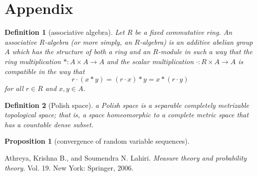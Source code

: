 \documentclass{report}
\newtheorem{definition}{Definition}[section]
\newtheorem{proposition}{Proposition}[section]
\theoremstyle{nonumberplain}
\begin{document}
\chapter*{Appendix}
\begin{definition}[associative algebra]
	Let $R$ be a fixed commutative ring. An associative $R$-algebra (or more simply, an $R$-algebra) is an additive abelian group $A$ which has the structure of both a ring and an $R$-module in such a way that the ring multiplication $*:A\times A\to A$ and the scalar multiplication $\cdot:R\times A\to A$ is compatible in the way that
	\[
		r\cdot (x*y)=(r\cdot x)*y=x*(r\cdot y)
	\]
	for all $r \in R$ and $x, y \in A$.
\end{definition}

\begin{definition}[Polish space]
 a Polish space is a separable completely metrizable topological space; that is, a space homeomorphic to a complete metric space that has a countable dense subset.
\end{definition}

\begin{proposition}[convergence of random variable sequences]
		~\\
		
\end{proposition}

\newpage

\begin{thebibliography}{99}  
	Athreya, Krishna B., and Soumendra N. Lahiri. \emph{Measure theory and probability theory}. Vol. 19. New York: Springer, 2006.
\end{thebibliography}
\end{document}
